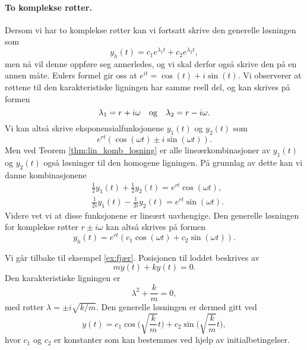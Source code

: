 \documentclass{article}
\theoremstyle{definition}
\theoremstyle{remark}
\newenvironment{ex}
{\pushQED{\qed}\renewcommand{\qedsymbol}{$\triangle$}\exx}
{\popQED\endexx}
\begin{document}
\begin{multicols*}{2}
\paragraph*{To komplekse røtter.} Dersom vi har to komplekse røtter kan vi fortsatt skrive den generelle løsningen som
\begin{equation*}
  y_h(t) = c_1 e^{\lambda_1 t} + c_2 e^{\lambda_2 t},
\end{equation*}
men nå vil denne oppføre seg annerledes, og vi skal derfor også skrive den på en annen måte. Eulers formel gir oss at $e^{i t} = \cos(t) + i \sin(t)$. Vi observerer at røttene til den karakteristiske ligningen har samme reell del, og kan skrives på formen
\begin{equation*}
  \lambda_1 = r + i \omega \ \ \textnormal{ og }\ \ \lambda_2 = r - i \omega.
\end{equation*}
Vi kan altså skrive eksponensialfunksjonene $y_1(t)$ og $y_2(t)$ som
\begin{equation*}
  e^{rt} (\cos(\omega t) \pm i \sin(\omega t)).
\end{equation*}
Men ved Teorem \ref{thm:lin_komb_losning} er alle lineærkombinasjoner av $y_1(t)$ og $y_2(t)$ også løsninger til den homogene ligningen. På grunnlag av dette kan vi danne kombinasjonene 
\begin{equation*}
  \begin{split}
    & \frac{1}{2}y_1(t) + \frac{1}{2} y_2(t) = e^{r t} \cos(\omega t), \\
    & \frac{1}{2i}y_1(t) - \frac{1}{2i} y_2(t) = e^{r t} \sin(\omega t).
  \end{split}
\end{equation*}
Videre vet vi at disse funksjonene er lineært uavhengige. Den generelle løsningen for komplekse røtter $r \pm i \omega$ kan altså skrives på formen
\begin{equation*}
  y_h(t) = e^{r t} (c_1 \cos(\omega t) + c_2 \sin(\omega t)).
\end{equation*}

\begin{ex}
  Vi går tilbake til eksempel \ref{ex:fjær}. Posisjonen til loddet beskrives av
  \begin{equation*}
    m \ddot{y}(t) + ky(t) = 0.
  \end{equation*}
  Den karakteristiske ligningen er
  \begin{equation*}
    \lambda^2 + \frac{k}{m} = 0,
  \end{equation*}
  med røtter $\lambda = \pm i \sqrt{k/m}$. Den generelle løsningen er dermed gitt ved
  \begin{equation*}
    y(t) = c_1 \cos\bigg(\sqrt{\frac{k}{m}} t\bigg) + c_2 \sin\bigg(\sqrt{\frac{k}{m}} t\bigg),
  \end{equation*}
  hvor $c_1$ og $c_2$ er konstanter som kan bestemmes ved hjelp av initialbetingelser.
\end{ex}


\end{multicols*}
\end{document}
